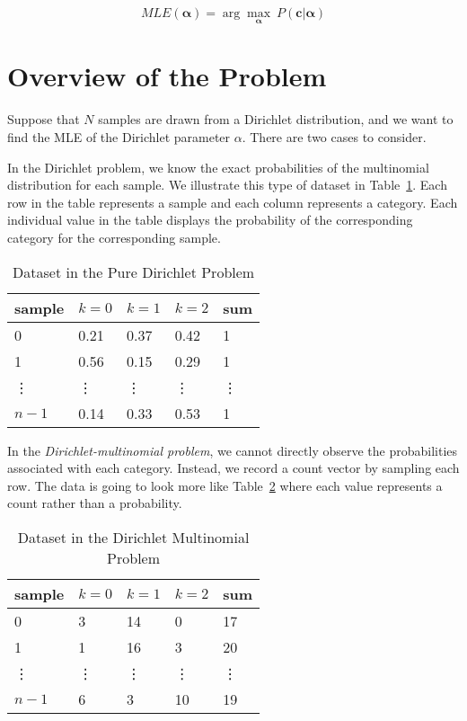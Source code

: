 \documentclass[twoside]{article}
\begin{document}
\[MLE(\mathbf{\alpha})=\arg\max_\mathbf{\alpha}\ P(\mathbf{c}|\mathbf{\alpha})\]

\section{Overview of the Problem}

Suppose that $N$ samples are drawn from a Dirichlet distribution, and we want to find the MLE of the Dirichlet parameter $\alpha$.  There are two cases to consider.

In the Dirichlet problem, we know the exact probabilities of the multinomial distribution for each sample. We illustrate this type of dataset in Table~\ref{tab:d}. Each row in the table represents a sample and each column represents a category. Each individual value in the table displays the probability of the corresponding category for the corresponding sample.

\begin{table}[h] \centering
\begin{tabular}{ l | l l l | l}
  sample & \(k=0\) & \(k=1\) & \(k=2\) & sum \\ \hline
  0 & 0.21 & 0.37 & 0.42 & 1\\
  1 & 0.56 & 0.15 & 0.29 & 1\\
  \vdots & \vdots & \vdots & \vdots & \vdots\\
  \(n-1\) & 0.14 & 0.33 & 0.53 & 1\\
\end{tabular}
\caption{Dataset in the Pure Dirichlet Problem}\label{tab:d}
\end{table}

In the \textit{Dirichlet-multinomial problem}, we cannot directly observe the probabilities associated with each category. Instead, we record a count vector by sampling each row. The data is going to look more like Table~\ref{tab:dm} where each value represents a count rather than a probability.

\begin{table}[h] \centering
\begin{tabular}{ l | l l l | l}
  sample & \(k=0\) & \(k=1\) & \(k=2\) & sum \\ \hline
  0 & 3 & 14 & 0 & 17\\
  1 & 1 & 16 & 3 & 20\\
  \vdots & \vdots & \vdots & \vdots & \vdots\\
  \(n-1\) & 6 & 3 & 10 & 19\\
\end{tabular}
\caption{Dataset in the Dirichlet Multinomial Problem}\label{tab:dm}
\end{table}
\end{document}
